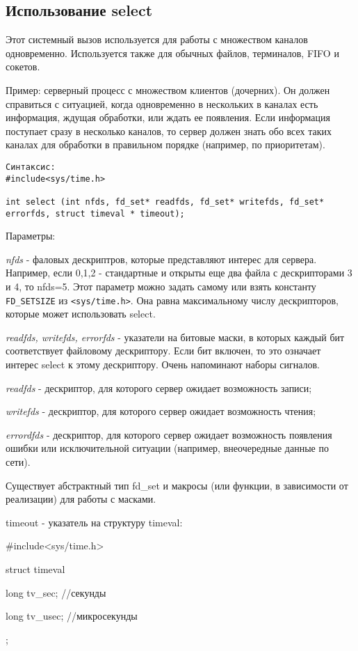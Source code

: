 \subsection{Использование select}

Этот системный вызов используется для работы с множеством каналов
одновременно. Используется также для обычных файлов, терминалов, FIFO
и сокетов.

Пример: серверный процесс с множеством клиентов (дочерних). Он должен
справиться с ситуацией, когда одновременно в нескольких в каналах есть
информация, ждущая обработки, или ждать ее появления. Если информация
поступает сразу в несколько каналов, то сервер должен знать обо всех
таких каналах для обработки в правильном порядке (например, по
приоритетам).

\begin{verbatim}
Синтаксис:
#include<sys/time.h>

int select (int nfds, fd_set* readfds, fd_set* writefds, fd_set*
errorfds, struct timeval * timeout);
\end{verbatim}

Параметры:

\emph{nfds} - фаловых дескриптров, которые представляют интерес для сервера.
Например, если 0,1,2 - стандартные и открыты еще два файла с
дескрипторами 3 и 4, то nfds=5. Этот параметр можно задать самому или
взять константу \verb+FD_SETSIZE+ из \verb+<sys/time.h>+. Она равна максимальному
числу дескрипторов, которые может использовать select.

\emph{readfds, writefds, errorfds} - указатели на битовые маски, в которых
каждый бит соответствует файловому дескриптору. Если бит включен, то
это означает интерес select к этому дескриптору. Очень напоминают
наборы сигналов.

\emph{readfds} - дескриптор, для которого сервер ожидает возможность записи;

\emph{writefds} - дескриптор, для которого сервер ожидает возможность чтения;

\emph{errordfds} - дескриптор, для которого сервер ожидает возможность
появления ошибки или исключительной ситуации (например, внеочередные
данные по сети).

Существует абстрактный тип fd_set и макросы (или функции, в
зависимости от реализации) для работы с масками.

timeout - указатель на структуру timeval:

#include<sys/time.h>

struct timeval {

long tv_sec; //секунды

long tv_usec; //микросекунды

};

